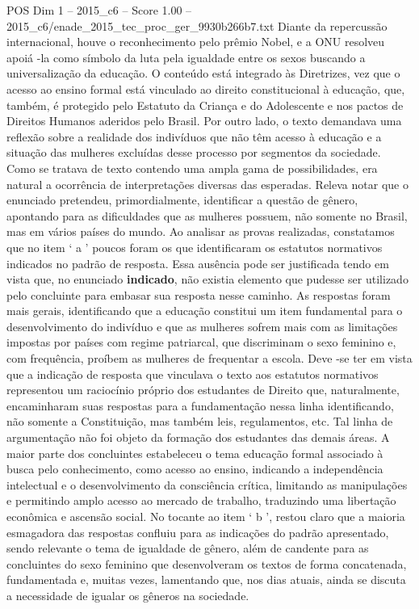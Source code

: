 \begin{textsample}{POS Dim 1 – 2015\_c6 – Score 1.00 – 2015\_c6/enade\_2015\_tec\_proc\_ger\_9930b266b7.txt}
Diante da repercussão internacional, houve o reconhecimento pelo prêmio Nobel, e a ONU resolveu apoiá -la como símbolo da luta pela igualdade entre os sexos buscando a universalização da educação.
O conteúdo está integrado às Diretrizes, vez que o acesso ao ensino formal está vinculado ao direito constitucional à educação, que, também, é protegido pelo Estatuto da Criança e do Adolescente e nos pactos de Direitos Humanos aderidos pelo Brasil.
Por outro lado, o texto demandava uma reflexão sobre a realidade dos indivíduos que não têm acesso à educação e a situação das mulheres excluídas desse processo por segmentos da sociedade.
Como se tratava de texto contendo uma ampla gama de possibilidades, era natural a ocorrência de interpretações diversas das esperadas.
Releva notar que o enunciado pretendeu, primordialmente, identificar a questão de gênero, apontando para as dificuldades que as mulheres possuem, não somente no Brasil, mas em vários países do mundo.
Ao analisar as provas realizadas, constatamos que no item ‘ a ’ poucos foram os que identificaram os estatutos normativos indicados no padrão de resposta.
Essa ausência pode ser justificada tendo em vista que, no enunciado \textbf{indicado}, não existia elemento que pudesse ser utilizado pelo concluinte para embasar sua resposta nesse caminho.
As respostas foram mais gerais, identificando que a educação constitui um item fundamental para o desenvolvimento do indivíduo e que as mulheres sofrem mais com as limitações impostas por países com regime patriarcal, que discriminam o sexo feminino e, com frequência, proíbem as mulheres de frequentar a escola.
Deve -se ter em vista que a indicação de resposta que vinculava o texto aos estatutos normativos representou um raciocínio próprio dos estudantes de Direito que, naturalmente, encaminharam suas respostas para a fundamentação nessa linha identificando, não somente a Constituição, mas também leis, regulamentos, etc.
Tal linha de argumentação não foi objeto da formação dos estudantes das demais áreas.
A maior parte dos concluintes estabeleceu o tema educação formal associado à busca pelo conhecimento, como acesso ao ensino, indicando a independência intelectual e o desenvolvimento da consciência crítica, limitando as manipulações e permitindo amplo acesso ao mercado de trabalho, traduzindo uma libertação econômica e ascensão social.
No tocante ao item ‘ b ’, restou claro que a maioria esmagadora das respostas confluiu para as indicações do padrão apresentado, sendo relevante o tema de igualdade de gênero, além de candente para as concluintes do sexo feminino que desenvolveram os textos de forma concatenada, fundamentada e, muitas vezes, lamentando que, nos dias atuais, ainda se discuta a necessidade de igualar os gêneros na sociedade.

\end{textsample}

